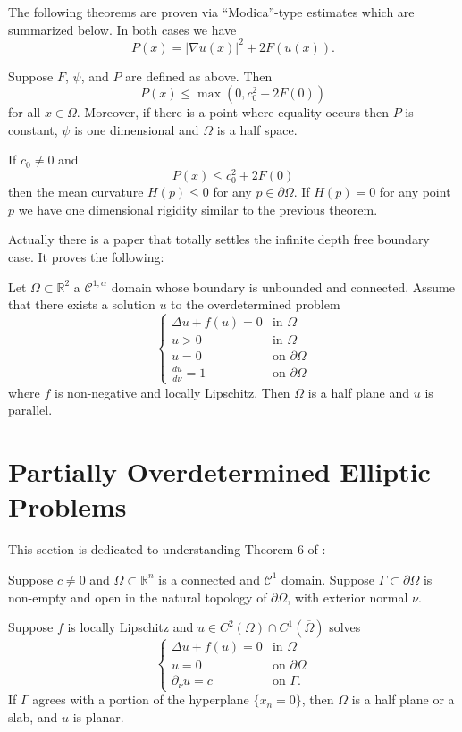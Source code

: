 The following theorems are proven via ``Modica''-type estimates which are summarized below. In both cases we have 
\[P(x) = |\nabla u(x)|^2 + 2F(u(x)).\]

\begin{theorem}
    Suppose $F$, $\psi$, and $P$ are defined as above. Then
    \[P(x) \leq \max(0, c_0^2 + 2F(0))\]
    for all $x \in \Omega$. Moreover, if there is a point where equality occurs then $P$ is constant, $\psi$ is one dimensional and $\Omega$ is a half space.
\end{theorem}

\begin{theorem}
    If $c_0 \neq 0$ and 
    \[P(x) \leq c_0^2 + 2F(0)\]
    then the mean curvature $H(p) \leq 0$ for any $p \in \partial \Omega$. If $H(p) = 0$ for any point $p$ we have one dimensional rigidity similar to the previous theorem.
\end{theorem}

Actually there is a paper \cite{RRS17} that totally settles the infinite depth free boundary case. It proves the following:
\begin{theorem}
    Let $\Omega \subset \mathbb{R}^2$ a $\mathcal{C}^{1,\alpha}$ domain whose boundary is unbounded and connected. Assume that there exists a solution $u$ to the overdetermined problem
    \[\begin{cases}
        \Delta u + f(u) = 0 & \text{in $\Omega$} \\
        u > 0 & \text{in $\Omega$} \\
        u = 0 & \text{on $\partial \Omega$} \\
        \frac{du}{d\nu} = 1 & \text{on $\partial \Omega$}
    \end{cases}\]
    where $f$ is non-negative and locally Lipschitz. Then $\Omega$ is a half plane and $u$ is parallel.
\end{theorem}

\section{Partially Overdetermined Elliptic Problems}

This section is dedicated to understanding Theorem 6 of \cite{FV13}:

\begin{theorem}
    Suppose $c \neq 0$ and $\Omega \subset \mathbb{R}^n$ is a connected and $\mathcal{C}^1$ domain. Suppose $\Gamma \subset \partial \Omega$ is non-empty and open in the natural topology of $\partial \Omega$, with exterior normal $\nu$.

    Suppose $f$ is locally Lipschitz and $u \in C^2(\Omega) \cap C^1(\overline{\Omega})$ solves
    \[
        \begin{cases}
            \Delta u + f(u) = 0 & \text{in $\Omega$} \\
            u = 0 & \text{on $\partial \Omega$} \\
            \partial_\nu u = c & \text{on $\Gamma$.}
        \end{cases}
    \]
    If $\Gamma$ agrees with a portion of the hyperplane $\{x_n = 0\}$, then $\Omega$ is a half plane or a slab, and $u$ is planar.
\end{theorem}  

